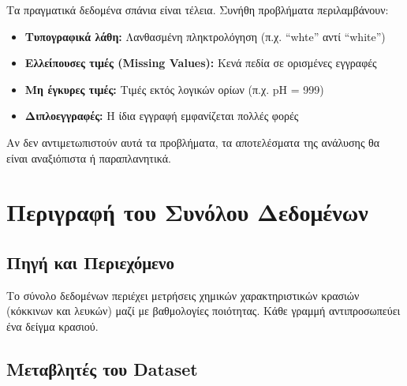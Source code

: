 \documentclass[12pt,a4paper]{article}
\begin{document}
Τα πραγματικά δεδομένα σπάνια είναι τέλεια. Συνήθη προβλήματα περιλαμβάνουν:

\begin{itemize}
    \item \textbf{Τυπογραφικά λάθη:} Λανθασμένη πληκτρολόγηση (π.χ. ``whte'' αντί ``white'')
    \item \textbf{Ελλείπουσες τιμές (Missing Values):} Κενά πεδία σε ορισμένες εγγραφές
    \item \textbf{Μη έγκυρες τιμές:} Τιμές εκτός λογικών ορίων (π.χ. pH = 999)
    \item \textbf{Διπλοεγγραφές:} Η ίδια εγγραφή εμφανίζεται πολλές φορές
\end{itemize}

Αν δεν αντιμετωπιστούν αυτά τα προβλήματα, τα αποτελέσματα της ανάλυσης θα είναι αναξιόπιστα ή παραπλανητικά.

\section{Περιγραφή του Συνόλου Δεδομένων}

\subsection{Πηγή και Περιεχόμενο}

Το σύνολο δεδομένων περιέχει μετρήσεις χημικών χαρακτηριστικών κρασιών (κόκκινων και λευκών) μαζί με βαθμολογίες ποιότητας. Κάθε γραμμή αντιπροσωπεύει ένα δείγμα κρασιού.

\subsection{Μεταβλητές του Dataset}
\end{document}
